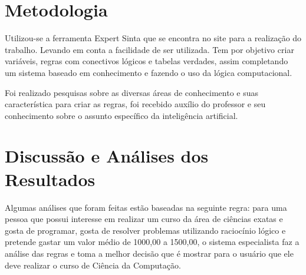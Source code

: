\section{Metodologia}
\label{metodologia}

Utilizou-se a ferramenta Expert Sinta que se encontra no {site}\footnotemark {} para a  realização do trabalho. Levando em conta a facilidade de ser utilizada. Tem por objetivo criar variáveis,  regras com conectivos lógicos e tabelas verdades, assim completando um sistema baseado em conhecimento e fazendo o uso da lógica computacional.

Foi realizado pesquisas sobre as diversas áreas de conhecimento e suas característica para criar as regras, foi recebido auxílio do professor e seu conhecimento sobre o assunto específico da inteligência artificial.



\section{Discussão e Análises dos Resultados}
\label{discussão}
Algumas análises que foram feitas estão baseadas na seguinte regra: para uma pessoa que possui interesse em realizar um curso da área de ciências exatas e gosta de programar, gosta de resolver problemas utilizando raciocínio lógico e pretende gastar um valor médio de 1000,00 a 1500,00, o sistema especialista faz a análise das regras e toma a melhor decisão que é mostrar para o usuário que ele deve realizar o curso de Ciência da Computação. 



